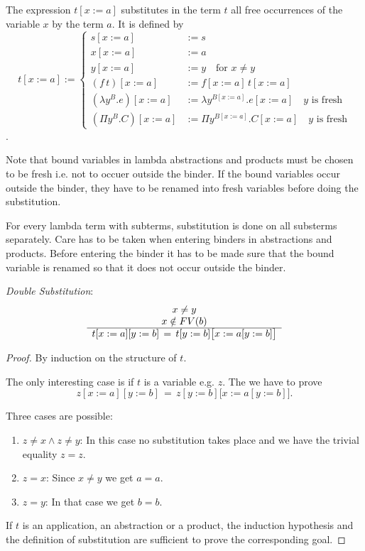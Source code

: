 \documentclass[12pt]{article}
\begin{document}
\begin{definition}
  The expression $t[x:=a]$ substitutes in the term $t$ all free occurrences of
  the variable $x$ by the term $a$. It is defined by
  $$
  t[x:=a] :=
  \begin{cases}
    s[x:=a] &:= s
    \\
    x[x:=a] &:= a
    \\
    y[x:=a] &:= y \quad\text{for } x \ne y
    \\
    (f \, t)[x:=a] &:= f[x:=a] \, t[x:=a]
    \\
    (\lambda y^B.e)[x:=a] &:= \lambda y^{B[x:=a]}. e[x:=a]
    \quad y \text{ is fresh}
    \\
    (\Pi y^B.C)[x:=a] &:= \Pi y^{B[x:=a]}. C[x:=a]
    \quad y \text{ is fresh}
  \end{cases}
  $$.

  Note that bound variables in lambda abstractions and products must be chosen
  to be fresh i.e. not to occuer outside the binder. If the bound variables
  occur outside the binder, they have to be renamed into fresh variables
  before doing the substitution.
\end{definition}

For every lambda term with subterms, substitution is done on all substerms
separately. Care has to be taken when entering binders in abstractions and
products. Before entering the binder it has to be made sure that the bound
variable is renamed so that it does not occur outside the binder.


\begin{lemma}
  \label{doublesubstitution}
  \emph{Double Substitution}:
  $$
  \begin{array}{c} x \neq y
    \\
    x \notin FV(b)
   \\ \hline t[x:=a][y:=b]\, = \, t[y:=b]\big[x:=a[y:=b]\big]\end{array}
  $$
  \begin{proof}
    By induction on the structure of $t$.

    The only interesting case is if $t$ is a variable e.g. $z$. The we have to
    prove
    $$ z[x:=a][y:=b]\, = \, z[y:=b]\big[x:=a[y:=b]\big].$$

    Three cases are possible:
    \begin{enumerate}
    \item
      $z \ne x \land z \ne y$: In this case no substitution takes place and we
      have the trivial equality $z = z$.

    \item $z = x$: Since $x \ne y$ we get $a = a$.

    \item $z = y$: In that case we get $b = b$.
    \end{enumerate}

    If $t$ is an application, an abstraction or a product, the induction
    hypothesis and the definition of substitution are sufficient to prove the
    corresponding goal.
  \end{proof}
\end{lemma}
\end{document}
